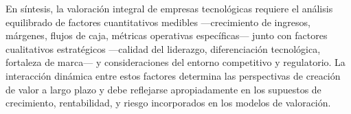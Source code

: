 En síntesis, la valoración integral de empresas tecnológicas requiere el análisis equilibrado de factores cuantitativos medibles ---crecimiento de ingresos, márgenes, flujos de caja, métricas operativas específicas--- junto con factores cualitativos estratégicos ---calidad del liderazgo, diferenciación tecnológica, fortaleza de marca--- y consideraciones del entorno competitivo y regulatorio. La interacción dinámica entre estos factores determina las perspectivas de creación de valor a largo plazo y debe reflejarse apropiadamente en los supuestos de crecimiento, rentabilidad, y riesgo incorporados en los modelos de valoración. 